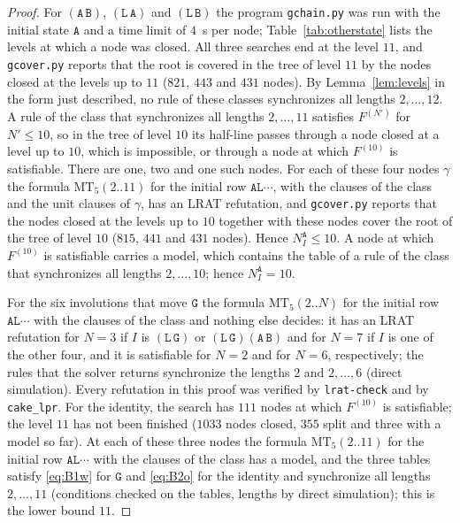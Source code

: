 \documentclass[11pt]{article}
\theoremstyle{remark}
\newcommand{\Lq}{\mathtt{L}}\newcommand{\Gq}{\mathtt{G}}\newcommand{\Aq}{\mathtt{A}}\newcommand{\Bq}{\mathtt{B}}\newcommand{\Fq}{\mathtt{F}}
\newcommand{\MT}{\mathrm{MT}}
\begin{document}
\begin{proof}
For $(\Aq\,\Bq)$, $(\Lq\,\Aq)$ and $(\Lq\,\Bq)$ the program \texttt{gchain.py} was run with the initial
state $\Aq$ and a time limit of $4$~s per node; Table~\ref{tab:otherstate} lists the levels at which a node
was closed. All three searches end at the level $11$, and \texttt{gcover.py} reports that the root is covered
in the tree of level $11$ by the nodes closed at the levels up to $11$ ($821$, $443$ and $431$ nodes). By
Lemma~\ref{lem:levels} in the form just described, no rule of these classes synchronizes all lengths
$2,\dots,12$. A rule of the class that synchronizes all lengths $2,\dots,11$ satisfies $F^{(N')}$ for
$N'\le10$, so in the tree of level $10$ its half-line passes through a node closed at a level up to $10$,
which is impossible, or through a node at which $F^{(10)}$ is satisfiable. There are one, two and one such
nodes. For each of these four nodes $\gamma$ the formula $\MT_5(2..11)$ for the initial row $\Aq\Lq\cdots$,
with the clauses of the class and the unit clauses of $\gamma$, has an LRAT refutation, and
\texttt{gcover.py} reports that the nodes closed at the levels up to $10$ together with these nodes cover the
root of the tree of level $10$ ($815$, $441$ and $431$ nodes). Hence $N^{\Aq}_I\le10$. A node at which
$F^{(10)}$ is satisfiable carries a model, which contains the table of a rule of the class that synchronizes
all lengths $2,\dots,10$; hence $N^{\Aq}_I=10$.

For the six involutions that move $\Gq$ the formula $\MT_5(2..N)$ for the initial row $\Aq\Lq\cdots$ with the
clauses of the class and nothing else decides: it has an LRAT refutation for $N=3$ if $I$ is $(\Lq\,\Gq)$ or
$(\Lq\,\Gq)(\Aq\,\Bq)$ and for $N=7$ if $I$ is one of the other four, and it is satisfiable for $N=2$ and
for $N=6$, respectively; the rules that the solver returns synchronize the lengths $2$ and $2,\dots,6$
(direct simulation). Every refutation in this proof was verified by \texttt{lrat-check} and by
\texttt{cake\_lpr}. For the identity, the search has $111$ nodes at which $F^{(10)}$ is satisfiable; the
level $11$ has not been finished ($1033$ nodes closed, $355$ split and three with a model so far). At each of
these three nodes the formula $\MT_5(2..11)$ for the initial row $\Aq\Lq\cdots$ with the clauses of the class
has a model, and the three tables satisfy \eqref{eq:B1w} for $\Gq$ and \eqref{eq:B2o} for the identity and
synchronize all lengths $2,\dots,11$ (conditions checked on the tables, lengths by direct simulation); this is
the lower bound $11$.
\end{proof}
\end{document}

